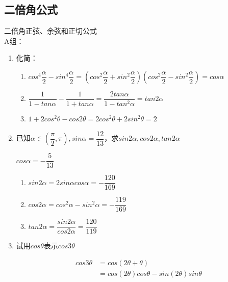 \subsection{二倍角公式}
\zsd 二倍角正弦、余弦和正切公式 \\
A组：
\begin{enumerate}
\item 化简：
\begin{jieda}
    \begin{enumerate}
        \item $cos^4\dfrac{\alpha}{2} - sin^4\dfrac{\alpha}{2} = \left(cos^2\dfrac{\alpha}{2} + sin^2\dfrac{\alpha}{2}\right) \left(cos^2\dfrac{\alpha}{2} - sin^2\dfrac{\alpha}{2}\right) = cos\alpha$
        \item $\dfrac{1}{1-tan\alpha} - \dfrac{1}{1+tan\alpha} = \dfrac{2tan\alpha}{1-tan^2\alpha} = tan2\alpha$
        \item $1+2cos^2\theta - cos2\theta = 2cos^2\theta + 2sin^2\theta = 2$
    \end{enumerate}
\end{jieda}
\item 已知$\alpha \in (\dfrac{\pi}{2}, \pi), sin\alpha = \dfrac{12}{13}$，求$sin2\alpha, cos2\alpha, tan2\alpha$
\begin{jieda}
    $cos\alpha = -\dfrac{5}{13}$
    \begin{enumerate}
        \item $sin2\alpha = 2sin\alpha cos\alpha = -\dfrac{120}{169}$
        \item $cos2\alpha = cos^2\alpha - sin^2\alpha = -\dfrac{119}{169}$
        \item $tan2\alpha = \dfrac{sin2\alpha}{cos2\alpha} = \dfrac{120}{119}$
    \end{enumerate}
\end{jieda}
\item 试用$cos\theta$表示$cos3\theta$
\begin{jieda}
    \begin{align*}
    cos3\theta & = cos(2\theta+\theta) \\
    & = cos(2\theta)cos\theta - sin(2\theta) sin\theta \\

\end{align*}
\end{jieda}
\end{enumerate}
